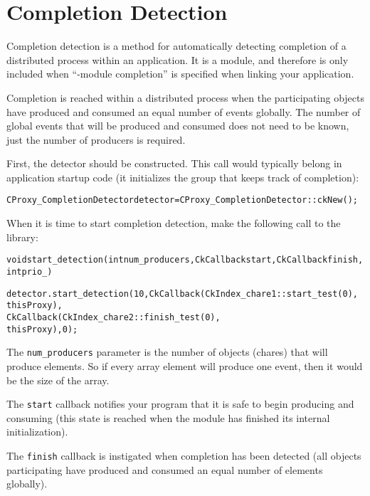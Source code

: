 \section{Completion Detection}

Completion detection is a method for automatically detecting
completion of a distributed process within an application. It is a
module, and therefore is only included when ``-module completion'' is
specified when linking your application.

Completion is reached within a distributed process when the
participating objects have produced and consumed an equal number of
events globally. The number of global events that will be produced and
consumed does not need to be known, just the number of producers is
required.

First, the detector should be constructed. This call would typically
belong in application startup code (it initializes the group that
keeps track of completion):

\begin{alltt}
CProxy_CompletionDetector detector = CProxy_CompletionDetector::ckNew();
\end{alltt}

When it is time to start completion detection, make the following call to the
library:

\begin{alltt}
void start_detection(int num_producers, CkCallback start, CkCallback finish,
int prio_)
\end{alltt}

\begin{alltt}
detector.start_detection(10, CkCallback(CkIndex_chare1::start_test(0),
                                       thisProxy),
                             CkCallback(CkIndex_chare2::finish_test(0),
                                       thisProxy), 0);
\end{alltt}

The \verb|num_producers| parameter is the number of objects (chares)
that will produce elements. So if every array element will produce one
event, then it would be the size of the array.

The \verb|start| callback notifies your program that it is safe to
begin producing and consuming (this state is reached when the module
has finished its internal initialization).

The \verb|finish| callback is instigated when completion has been
detected (all objects participating have produced and consumed an
equal number of elements globally).

